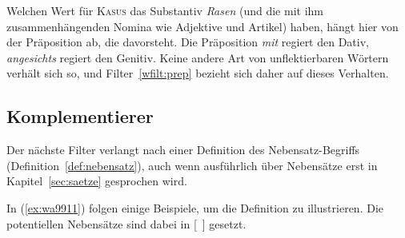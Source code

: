 \begin{exe}
  \ex
  \begin{xlist}
  \end{xlist}
\end{exe}

Welchen Wert für \textsc{Kasus} das Substantiv \textit{Rasen} (und die mit ihm zusammenhängenden Nomina wie Adjektive und Artikel) haben, hängt hier von der Präposition ab, die davorsteht.
Die Präposition \textit{mit} regiert den Dativ, \textit{angesichts} regiert den Genitiv.
Keine andere Art von unflektierbaren Wörtern verhält sich so, und Filter~\ref{wfilt:prep} bezieht sich daher auf dieses Verhalten.


\subsection{Komplementierer}

\label{sec:komplementiererwortklassen}


Der nächste Filter verlangt nach einer Definition des Nebensatz-Begriffs (Definition~\ref{def:nebensatz}), auch wenn ausführlich über Nebensätze erst in Kapitel~\ref{sec:saetze} gesprochen wird.


In (\ref{ex:wa9911}) folgen einige Beispiele, um die Definition zu illustrieren.
Die potentiellen Nebensätze sind dabei in [~] gesetzt.

\begin{exe}
  \ex\label{ex:wa9911}\begin{xlist}
  \end{xlist}
\end{exe}

